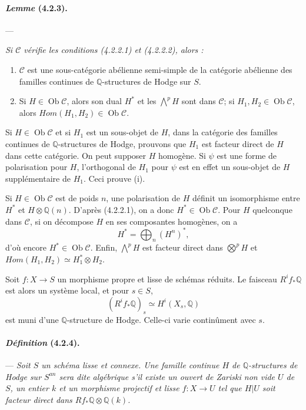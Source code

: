 \documentclass[10pt]{article}
\newcommand{\Q}{\mathbb Q}
\newcommand{\Ob}{\operatorname{Ob}}
\begin{document}
\paragraph{\emph{Lemme} (4.2.3).} --- {\itshape Si $\mathcal C$ vérifie les conditions (4.2.2.1) et (4.2.2.2), alors :
\begin{enumerate}[label=(\roman*)]
\item $\mathcal C$ est une sous-catégorie abélienne semi-simple de la catégorie abélienne des familles continues de $\Q$-structures de Hodge sur $S$.
\item Si $H\in\Ob\mathcal C$, alors son dual $H^*$ et les $\bigwedge^pH$ sont dans $\mathcal C$; si $H_1,H_2\in\Ob\mathcal C$, alors $\mathit{Hom}(H_1,H_2)\in\Ob\mathcal C$.
\end{enumerate}}

Si $H\in\Ob\mathcal C$ et si $H_1$ est un sous-objet de $H$, dans la catégorie des familles continues de $\Q$-structures de Hodge, prouvons que $H_1$ est facteur direct de $H$ dans cette catégorie. On peut supposer $H$ homogène. Si $\psi$ est une forme de polarisation pour $H$, l'orthogonal de $H_1$ pour $\psi$ est en effet un sous-objet de $H$ supplémentaire de $H_1$. Ceci prouve (i).

Si $H\in\Ob\mathcal C$ est de poids $n$, une polarisation de $H$ définit un isomorphisme entre $H^*$ et $H\otimes\Q(n)$. D'après (4.2.2.1), on a donc $H^*\in\Ob\mathcal C$. Pour $H$ quelconque dans $\mathcal C$, si on décompose $H$ en ses composantes homogènes, on a
\[
H^*=\bigoplus_n (H^n)^*,
\]
d'où encore $H^*\in\Ob\mathcal C$. Enfin, $\bigwedge^pH$ est facteur direct dans $\bigotimes^pH$ et $\mathit{Hom}(H_1,H_2)\simeq H_1^*\otimes H_2$.

Soit $f:X\to S$ un morphisme propre et lisse de schémas réduits. Le faisceau $R^if_*\Q$ est alors un système local, et pour $s\in S$,
\[
(R^if_*\Q)_s\simeq H^i(X_s,\Q)
\]
est muni d'une $\Q$-structure de Hodge. Celle-ci varie continûment avec $s$.

\paragraph{\emph{Définition} (4.2.4).} --- {\itshape Soit $S$ un schéma lisse et connexe. Une famille continue $H$ de $\Q$-structures de Hodge sur $S^{an}$ sera dite algébrique s'il existe un ouvert de Zariski non vide $U$ de $S$, un entier $k$ et un morphisme projectif et lisse $f:X\to U$ tel que $H|U$ soit facteur direct dans $Rf_*\Q\otimes\Q(k)$.}
\end{document}
